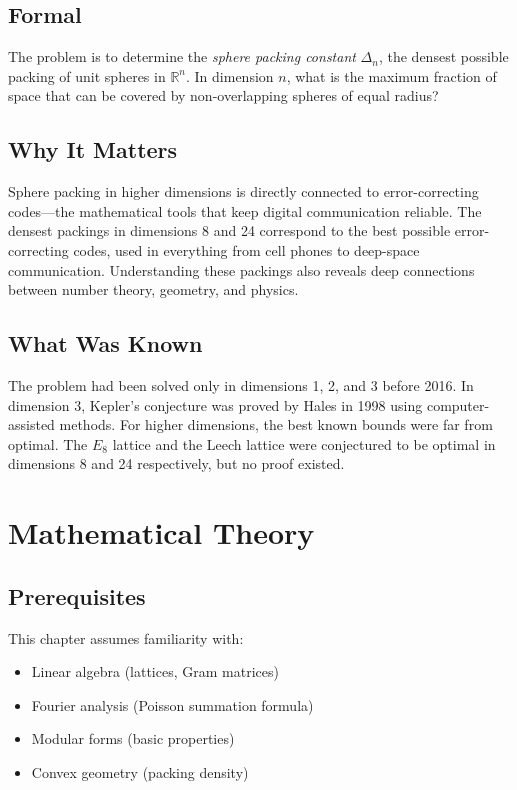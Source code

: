 \subsection{Formal}
The problem is to determine the \emph{sphere packing constant} $\Delta_n$, the densest possible packing of unit spheres in $\mathbb{R}^n$. In dimension $n$, what is the maximum fraction of space that can be covered by non-overlapping spheres of equal radius?

\subsection{Why It Matters}
Sphere packing in higher dimensions is directly connected to error-correcting codes---the mathematical tools that keep digital communication reliable. The densest packings in dimensions 8 and 24 correspond to the best possible error-correcting codes, used in everything from cell phones to deep-space communication. Understanding these packings also reveals deep connections between number theory, geometry, and physics.

\subsection{What Was Known}
The problem had been solved only in dimensions 1, 2, and 3 before 2016. In dimension 3, Kepler's conjecture was proved by Hales in 1998 using computer-assisted methods. For higher dimensions, the best known bounds were far from optimal. The $E_8$ lattice and the Leech lattice were conjectured to be optimal in dimensions 8 and 24 respectively, but no proof existed.

\section{Mathematical Theory}


\subsection{Prerequisites}
This chapter assumes familiarity with:
\begin{itemize}
\item Linear algebra (lattices, Gram matrices)
\item Fourier analysis (Poisson summation formula)
\item Modular forms (basic properties)
\item Convex geometry (packing density)
\end{itemize}

